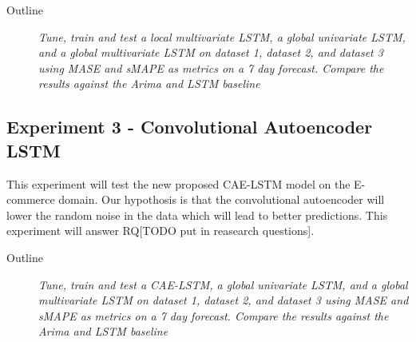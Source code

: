 \begin{description}
  \item[Outline]{\it Tune, train and test a local multivariate LSTM, a global univariate LSTM,
              and a global multivariate LSTM on dataset 1,
              dataset 2, and dataset 3 using MASE and sMAPE as metrics on a 7 day forecast. Compare the results against the Arima and LSTM baseline}
\end{description}

\subsection{Experiment 3 - Convolutional Autoencoder LSTM}
This experiment will test the new proposed CAE-LSTM model on
the E-commerce domain. Our hypothosis is that the convolutional autoencoder
will lower the random noise in the data which will lead to better predictions.
This experiment will answer RQ[TODO put in reasearch questions].

\begin{description}
  \item[Outline]{\it Tune, train and test a CAE-LSTM, a global univariate LSTM,
              and a global multivariate LSTM on dataset 1,
              dataset 2, and dataset 3 using MASE and sMAPE as metrics on a 7 day forecast. Compare the results against the Arima and LSTM baseline}
\end{description}